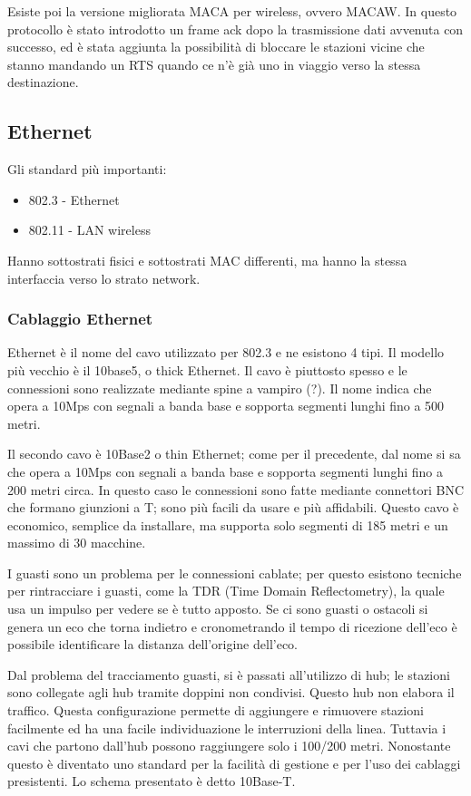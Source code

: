 Esiste poi la versione migliorata MACA per wireless, ovvero MACAW.
In questo protocollo è stato introdotto un frame ack dopo la trasmissione dati avvenuta con successo,
ed è stata aggiunta la possibilità di bloccare le stazioni vicine che stanno mandando un RTS quando ce n'è già uno in viaggio verso la stessa destinazione.

\subsection{Ethernet} %
Gli standard più importanti:
\begin{itemize}
\item 802.3 - Ethernet
\item 802.11 - LAN wireless
\end{itemize}
Hanno sottostrati fisici e sottostrati MAC differenti, ma hanno la stessa interfaccia verso lo strato network.

\subsubsection{Cablaggio Ethernet}
Ethernet è il nome del cavo utilizzato per 802.3 e ne esistono 4 tipi.
Il modello più vecchio è il 10base5, o thick Ethernet.
Il cavo è piuttosto spesso e le connessioni sono realizzate mediante spine a vampiro (?).
Il nome indica che opera a 10Mps con segnali a banda base e sopporta segmenti lunghi fino a 500 metri.

Il secondo cavo è 10Base2 o thin Ethernet;
come per il precedente, dal nome si sa che opera a 10Mps con segnali a banda base e sopporta segmenti lunghi fino a 200 metri circa.
In questo caso le connessioni sono fatte mediante connettori BNC che formano giunzioni a T; sono più facili da usare e più affidabili.
Questo cavo è economico, semplice da installare, ma supporta solo segmenti di 185 metri e un massimo di 30 macchine.

I guasti sono un problema per le connessioni cablate; per questo esistono tecniche per rintracciare i guasti,
come la TDR (Time Domain Reflectometry), la quale usa un impulso per vedere se è tutto apposto.
Se ci sono guasti o ostacoli si genera un eco che torna indietro e cronometrando il tempo di ricezione dell'eco è possibile identificare la distanza dell'origine dell'eco.

Dal problema del tracciamento guasti, si è passati all'utilizzo di hub; le stazioni sono collegate agli hub tramite doppini non condivisi.
Questo hub non elabora il traffico.
Questa configurazione permette di aggiungere e rimuovere stazioni facilmente ed ha una facile individuazione le interruzioni della linea.
Tuttavia i cavi che partono dall'hub possono raggiungere solo i 100/200 metri.
Nonostante questo è diventato uno standard per la facilità di gestione e per l'uso dei cablaggi presistenti.
Lo schema presentato è detto 10Base-T.


